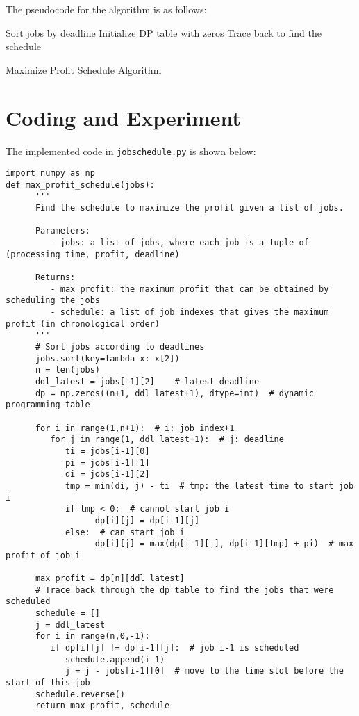 \documentclass[UTF8]{ctexart}
\begin{document}
The pseudocode for the algorithm is as follows:

\begin{algorithm}[H]
   \SetAlgoLined
   Sort jobs by deadline\;
   Initialize DP table with zeros\;
   Trace back to find the schedule\;
   \;
   \caption{Maximize Profit Schedule Algorithm}
\end{algorithm}

\newpage
\section{Coding and Experiment}
The implemented code in \texttt{jobschedule.py} is shown below:\\
\begin{lstlisting}
import numpy as np
def max_profit_schedule(jobs):
      '''
      Find the schedule to maximize the profit given a list of jobs.
      
      Parameters:
         - jobs: a list of jobs, where each job is a tuple of (processing time, profit, deadline)
      
      Returns:
         - max profit: the maximum profit that can be obtained by scheduling the jobs
         - schedule: a list of job indexes that gives the maximum profit (in chronological order)
      '''
      # Sort jobs according to deadlines
      jobs.sort(key=lambda x: x[2])
      n = len(jobs)
      ddl_latest = jobs[-1][2]    # latest deadline
      dp = np.zeros((n+1, ddl_latest+1), dtype=int)  # dynamic programming table
      
      for i in range(1,n+1):  # i: job index+1
         for j in range(1, ddl_latest+1):  # j: deadline
            ti = jobs[i-1][0]
            pi = jobs[i-1][1]
            di = jobs[i-1][2]
            tmp = min(di, j) - ti  # tmp: the latest time to start job i
            if tmp < 0:  # cannot start job i
                  dp[i][j] = dp[i-1][j]
            else:  # can start job i
                  dp[i][j] = max(dp[i-1][j], dp[i-1][tmp] + pi)  # max profit of job i
      
      max_profit = dp[n][ddl_latest]
      # Trace back through the dp table to find the jobs that were scheduled
      schedule = []
      j = ddl_latest
      for i in range(n,0,-1):
         if dp[i][j] != dp[i-1][j]:  # job i-1 is scheduled
            schedule.append(i-1)
            j = j - jobs[i-1][0]  # move to the time slot before the start of this job
      schedule.reverse()
      return max_profit, schedule
\end{lstlisting}
\end{document}
